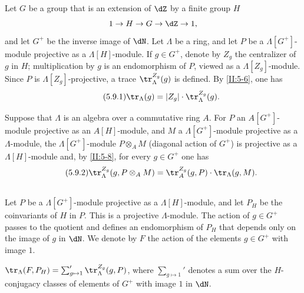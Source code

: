\subsection{}\label{II:5-9}

Let $G$ be a group that is an extension of $\dZ$ by a finite group $H$
\[
  1 \to H \to G \to \dZ \to 1 \text{,}
\]
and let $G^+$ be the inverse image of $\dN$. Let $\Lambda$ be a ring, and let
$P$ be a $\Lambda[G^+]$-module projective as a $\Lambda[H]$-module. If
$g\in G^+$, denote by $Z_g$ the centralizer of $g$ in $H$; multiplication by
$g$ is an endomorphism of $P$, viewed as a $\Lambda[Z_g]$-module. Since $P$
is $\Lambda[Z_g]$-projective, a trace $\tr_\Lambda^{Z_g}(g)$ is defined. By
\ref{II:5-6}, one has
\begin{equation*}\tag{5.9.1}\label{II:eq:5-9-1}
  \tr_\Lambda(g) = |Z_g| \cdot \tr_\Lambda^{Z_g}(g) \text{.}
\end{equation*}

Suppose that $\Lambda$ is an algebra over a commutative ring $A$. For $P$ an
$A[G^+]$-module projective as an $A[H]$-module, and $M$ a
$\Lambda[G^+]$-module projective as a $\Lambda$-module, the
$\Lambda[G^+]$-module $P\otimes_A M$ (diagonal action of $G^+$) is projective
as a $\Lambda[H]$-module and, by \ref{II:5-8}, for every $g\in G^+$ one has
\begin{equation*}\tag{5.9.2}\label{II:eq:5-9-2}
  \tr_\Lambda^{Z_g}(g,P\otimes_A M) = \tr_A^{Z_g}(g,P) \cdot \tr_\Lambda(g,M) \text{.}
\end{equation*}






\subsection{}\label{II:5-10}

Let $P$ be a $\Lambda[G^+]$-module projective as a $\Lambda[H]$-module, and
let $P_H$ be the coinvariants of $H$ in $P$. This is a projective
$\Lambda$-module. The action of $g\in G^+$ passes to the quotient and defines
an endomorphism of $P_H$ that depends only on the image of $g$ in $\dN$. We
denote by $F$ the action of the elements $g\in G^+$ with image $1$.






\begin{proposition_}\label{II:5-11}
$\tr_\Lambda(F,P_H) = \sum_{g\mapsto 1}' \tr_\Lambda^{Z_g}(g,P)$, where
$\sum_{g\mapsto 1}'$ denotes a sum over the $H$-conjugacy classes of elements
of $G^+$ with image $1$ in $\dN$.
\end{proposition_}

